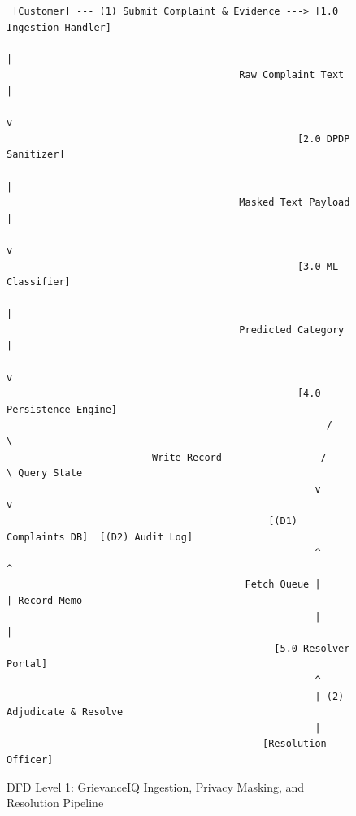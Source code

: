 \begin{figure}[h]
\centering
\begin{verbatim}
 [Customer] --- (1) Submit Complaint & Evidence ---> [1.0 Ingestion Handler]
                                                            |
                                        Raw Complaint Text  |
                                                            v
                                                  [2.0 DPDP Sanitizer]
                                                            |
                                        Masked Text Payload |
                                                            v
                                                  [3.0 ML Classifier]
                                                            |
                                        Predicted Category  |
                                                            v
                                                  [4.0 Persistence Engine]
                                                       /          \
                         Write Record                 /            \ Query State
                                                     v              v
                                             [(D1) Complaints DB]  [(D2) Audit Log]
                                                     ^              ^
                                         Fetch Queue |              | Record Memo
                                                     |              |
                                              [5.0 Resolver Portal]
                                                     ^
                                                     | (2) Adjudicate & Resolve
                                                     |
                                            [Resolution Officer]
\end{verbatim}
\caption{DFD Level 1: GrievanceIQ Ingestion, Privacy Masking, and Resolution Pipeline}
\label{fig:dfd_level1}
\end{figure}

